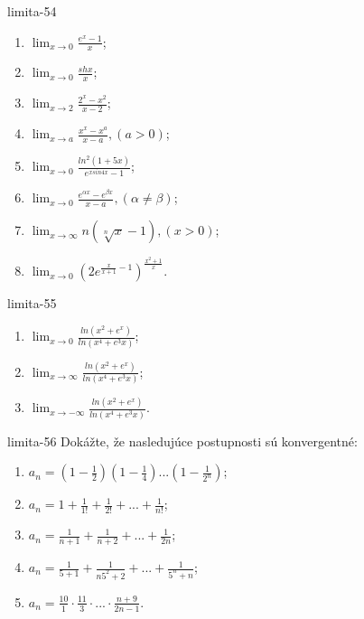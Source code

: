 \begin{defproblem}{limita-54}
\begin{multicols}{2}
\begin{enumerate}
    \item $\lim_{{x \rightarrow 0}} \frac{e^x-1}{x}$;
    \item $\lim_{{x \rightarrow 0}} \frac{sh x}{x}$;
    \item $\lim_{{x \rightarrow 2}} \frac{2^x-x^2}{x-2}$;
    \item $\lim_{{x \rightarrow a}} \frac{x^x-x^a}{x-a},(a>0)$;
    \item $\lim_{{x \rightarrow 0}} \frac{ln^2 (1+5x)}{e^{x sin 4x}-1}$;
    \item $\lim_{{x \rightarrow 0}} \frac{e^{\alpha x}-e^{\beta x}}{x-a},(\alpha \neq \beta)$;
    \item $\lim_{{x \rightarrow \infty}}n(\sqrt[n]{x}-1),(x>0)$;
    \item $\lim_{{x \rightarrow 0}} ({2e^{\frac{x}{x+1}-1}})^{\frac{x^2+1}{x}}$.
\end{enumerate}
\end{multicols}
\end{defproblem}

\begin{defproblem}{limita-55}
\begin{multicols}{2}
\begin{enumerate}
    \item $\lim_{{x \rightarrow 0}} \frac{ln(x^2+e^x)}{ln(x^4+e^3x)}$;
    \item $\lim_{{x \rightarrow \infty}} \frac{ln(x^2+e^x)}{ln(x^4+e^3x)}$;
    \item $\lim_{{x \rightarrow -\infty}} \frac{ln(x^2+e^x)}{ln(x^4+e^3x)}$.
\end{enumerate}
\end{multicols}
\end{defproblem}

\begin{defproblem}{limita-56}
Dokážte, že nasledujúce postupnosti sú konvergentné:
\begin{enumerate}
\item $a_n=(1-\frac{1}{2})(1-\frac{1}{4})...(1-\frac{1}{2^n})$;
\item $a_n=1+\frac{1}{1!}+\frac{1}{2!}+...+\frac{1}{n!}$;
\item $a_n=\frac{1}{n+1}+\frac{1}{n+2}+...+\frac{1}{2n}$;
\item $a_n=\frac{1}{5+1}+\frac{1}{n5^2+2}+...+\frac{1}{5^n+n}$;
\item $a_n=\frac{10}{1}\cdot \frac{11}{3}\cdot ...\cdot \frac{n+9}{2n-1}$.
\end{enumerate}
\end{defproblem}

